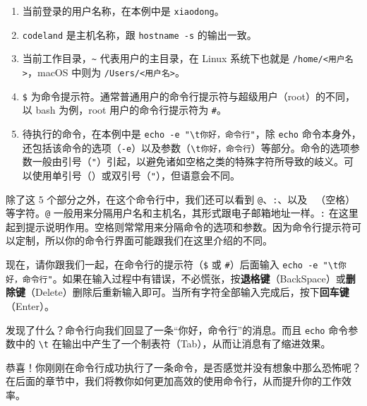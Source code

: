 \documentclass[]{ctexbook}
\newenvironment{Shaded}{\begin{snugshade}}{\end{snugshade}}
\newcommand{\ExtensionTok}[1]{#1}
\newcommand{\NormalTok}[1]{#1}
\newcommand{\StringTok}[1]{\textcolor[rgb]{0.31,0.60,0.02}{#1}}
\begin{document}
\begin{enumerate}
\def\labelenumi{\arabic{enumi}.}
\item
  当前登录的用户名称，在本例中是 \texttt{xiaodong}。
\item
  \texttt{codeland} 是主机名称，跟 \texttt{hostname\ -s} 的输出一致。
\item
  当前工作目录，\texttt{\textasciitilde{}} 代表用户的主目录，在 Linux 系统下也就是 \texttt{/home/\textless{}用户名\textgreater{}}，macOS 中则为 \texttt{/Users/\textless{}用户名\textgreater{}}。
\item
  \texttt{\$} 为命令提示符。通常普通用户的命令行提示符与超级用户（root）的不同，以 bash 为例，root 用户的命令行提示符为 \texttt{\#}。
\item
  待执行的命令，在本例中是 \texttt{echo\ -e\ "\textbackslash{}t你好，命令行"}，除 \texttt{echo} 命令本身外，还包括该命令的选项（\texttt{-e}）以及参数（\texttt{\textbackslash{}t你好，命令行}）等部分。命令的选项参数一般由引号（\texttt{"}）引起，以避免诸如空格之类的特殊字符所导致的岐义。可以使用单引号（\texttt{\textquotesingle{}}）或双引号（\texttt{"}），但语意会不同。
\end{enumerate}

除了这 5 个部分之外，在这个命令行中，我们还可以看到 \texttt{@}、\texttt{:}、以及 \texttt{\textasciigrave{}\ \textasciigrave{}}（空格）等字符。\texttt{@} 一般用来分隔用户名和主机名，其形式跟电子邮箱地址一样。\texttt{:} 在这里起到提示说明作用。空格则常常用来分隔命令的选项和参数。因为命令行提示符可以定制，所以你的命令行界面可能跟我们在这里介绍的不同。

现在，请你跟我们一起，在命令行的提示符（\texttt{\$} 或 \texttt{\#}）后面输入 \texttt{echo\ -e\ "\textbackslash{}t你好，命令行"}。如果在输入过程中有错误，不必慌张，按\textbf{退格键}（BackSpace）或\textbf{删除键}（Delete）删除后重新输入即可。当所有字符全部输入完成后，按下\textbf{回车键}（Enter）。

发现了什么？命令行向我们回显了一条``你好，命令行''的消息。而且 \texttt{echo} 命令参数中的 \texttt{\textbackslash{}t} 在输出中产生了一个制表符（Tab），从而让消息有了缩进效果。

\begin{Shaded}
\end{Shaded}

恭喜！你刚刚在命令行成功执行了一条命令，是否感觉并没有想象中那么恐怖呢？在后面的章节中，我们将教你如何更加高效的使用命令行，从而提升你的工作效率。
\end{document}
